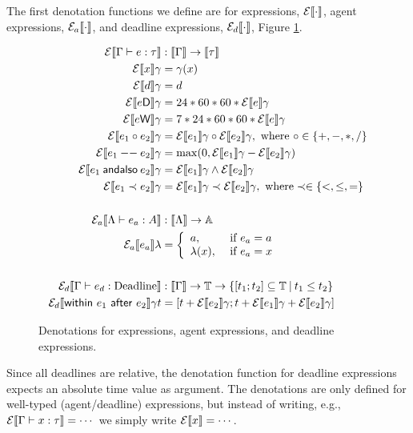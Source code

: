 \documentclass[orivec,final]{llncs-href}
\newcommand{\timeset}{\mathbb{T}}
\newcommand{\agentset}{\mathbb{A}}
\newcommand{\dendom}[1]{\llbracket #1 \rrbracket}
\newcommand{\type}{\tau}
\newcommand{\cwithinafter}[2]{\mathsf{within}\ #1\ \mathsf{after}\ #2}
\newcommand{\candalso}{\mathsf{andalso}}
\begin{document}
The first denotation functions we define are for expressions,
$\mathcal{E}\llbracket \cdot \rrbracket$, agent expressions, $\mathcal{E}_a\llbracket \cdot \rrbracket$,
and deadline expressions, $\cdendexp{\cdot}{}$, Figure
\ref{fig:denexp}.
\begin{figure}[b!]
  \begin{center}
    \begin{align*}
     \cdenexp{\ctexp{\Gamma}{e}{\type}}{} &: \dendom{\Gamma} \to
      \dendom{\type}\\
      \cdenexp{x}{\gamma} &= \gamma(x)\\
      \cdenexp{d}{\gamma} &= d\\
      \cdenexp{e \textsf{D}}{\gamma} &= 24 * 60 * 60 *
      \cdenexp{e}{\gamma}\\
      \cdenexp{e \textsf{W}}{\gamma} &= 7 * 24 * 60 * 60 *
      \cdenexp{e}{\gamma}\\
      \cdenexp{e_1 \circ e_2}{\gamma} &= \cdenexp{e_1}{\gamma} \circ
      \cdenexp{e_2}{\gamma}, \mbox{ where } \circ \in \{+,-,*,/\}\\
      \cdenexp{e_1 \mathbin{--} e_2}{\gamma} &= \max(0,\cdenexp{e_1}{\gamma} -
      \cdenexp{e_2}{\gamma})\\
      \cdenexp{e_1 \mathbin{\candalso} e_2}{\gamma} &=
      \cdenexp{e_1}{\gamma} \land \cdenexp{e_2}{\gamma}\\
      \cdenexp{e_1 \prec e_2}{\gamma} &= \cdenexp{e_1}{\gamma} \prec
      \cdenexp{e_2}{\gamma}, \mbox{ where} \prec \in \{<,\leq,=\}\\
      \\
      \cdenaexp{\ctaexp{\Lambda}{e_a}{A}}{} &: \dendom{\Lambda} \to
      \agentset\\
      \cdenaexp{e_a}{\lambda} &= \left\{
        \begin{array}{ll}
          a, & \mbox{ if } e_a = a\\
          \lambda(x), & \mbox{ if } e_a = x
        \end{array}
      \right.\\
      \\
      \cdendexp{\ctdexp{\Gamma}{e_d}}{}{} &: \dendom{\Gamma} \to \timeset
      \to \left\{ [t_1;t_2] \subseteq \timeset \mathbin{|} t_1
        \leq t_2 \right\}\\
      \cdendexp{\cwithinafter{e_1}{e_2}}{\gamma}{t} &= [t +
      \cdenexp{e_2}{\gamma}; t +
      \cdenexp{e_1}{\gamma} +
      \cdenexp{e_2}{\gamma}]
    \end{align*}
  \end{center}
  \caption{Denotations for expressions, agent expressions, and
    deadline expressions.}
  \label{fig:denexp}
\end{figure}
Since all deadlines are relative, the denotation
function for deadline expressions expects an absolute time value as
argument. The denotations are only defined for well-typed
(agent/deadline) expressions, but instead of writing,
e.g., $\cdenexp{\ctexp{\Gamma}{x}{\type}} = \cdots$ we simply write
$\mathcal{E}\llbracket x \rrbracket = \cdots$.
\end{document}
